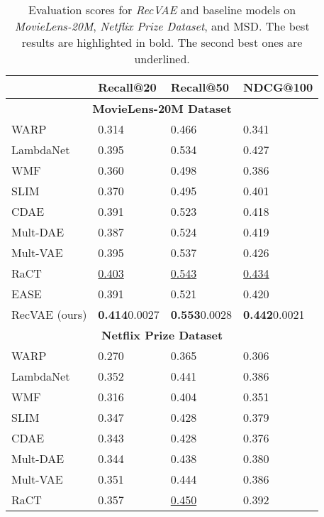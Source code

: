 \documentclass[sigconf,authorversion]{acmart}
\begin{document}
\begin{table}[!t]
\caption{Evaluation scores for \emph{RecVAE} and baseline models on \emph{MovieLens-20M}, \emph{Netflix Prize Dataset}, and MSD. The best results are highlighted in bold. The second best ones are underlined.} 
\centering
\begin{tabular}{l|l|l|l}\toprule
          & \bf Recall@20 & \bf Recall@50 & \bf NDCG@100 \\ \midrule
\multicolumn{4}{c}{\bf MovieLens-20M Dataset} \\\midrule
WARP     \cite{weston2011wsabie}       & 0.314 & 0.466 & 0.341 \\
LambdaNet\cite{burges2007learning}     & 0.395 & 0.534 & 0.427 \\
WMF      \cite{hu2008collaborative}    & 0.360 & 0.498 & 0.386 \\
SLIM     \cite{ning2011slim}           & 0.370 & 0.495 & 0.401 \\
CDAE     \cite{wu2016collaborative}    & 0.391 & 0.523 & 0.418 \\
Mult-DAE \cite{liang2018variational}   & 0.387 & 0.524 & 0.419 \\
Mult-VAE \cite{liang2018variational}   & 0.395 & 0.537 & 0.426 \\
RaCT     \cite{lobel2019towards}       & \underline{0.403} & \underline{0.543} & \underline{0.434} \\
EASE     \cite{steck2019embarrassingly}& 0.391 & 0.521 & 0.420 \\
RecVAE (ours)                          & \textbf{0.414}{\small0.0027} & \textbf{0.553}{\small0.0028} & \textbf{0.442}{\small0.0021} \\ \midrule
\multicolumn{4}{c}{\bf Netflix Prize Dataset} \\\midrule
WARP     \cite{weston2011wsabie}       & 0.270 & 0.365 & 0.306 \\
LambdaNet\cite{burges2007learning}     & 0.352 & 0.441 & 0.386 \\
WMF      \cite{hu2008collaborative}    & 0.316 & 0.404 & 0.351 \\
SLIM     \cite{ning2011slim}           & 0.347 & 0.428 & 0.379 \\
CDAE     \cite{wu2016collaborative}    & 0.343 & 0.428 & 0.376 \\
Mult-DAE \cite{liang2018variational}   & 0.344 & 0.438 & 0.380 \\
Mult-VAE \cite{liang2018variational}   & 0.351 & 0.444 & 0.386 \\
RaCT     \cite{lobel2019towards}       & 0.357 & \underline{0.450} & 0.392 \\

\end{tabular}
\end{table}
\end{document}
